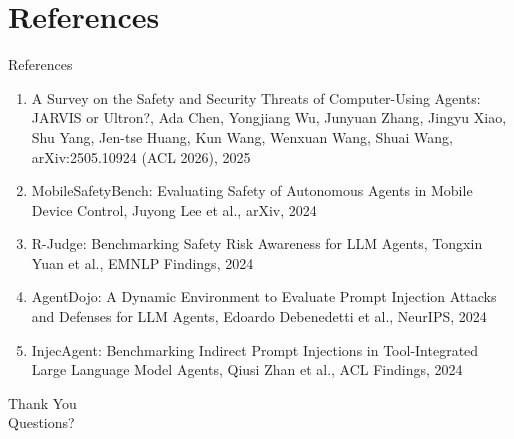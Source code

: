 \documentclass[10pt]{beamer}
\begin{document}
\section{References}
\begin{frame}[allowframebreaks]{References}
  \footnotesize
  \begin{enumerate}
    \item A Survey on the Safety and Security Threats of Computer-Using Agents: JARVIS or Ultron?, Ada Chen, Yongjiang Wu, Junyuan Zhang, Jingyu Xiao, Shu Yang, Jen-tse Huang, Kun Wang, Wenxuan Wang, Shuai Wang, arXiv:2505.10924 (ACL 2026), 2025
    \item MobileSafetyBench: Evaluating Safety of Autonomous Agents in Mobile Device Control, Juyong Lee et al., arXiv, 2024
    \item R-Judge: Benchmarking Safety Risk Awareness for LLM Agents, Tongxin Yuan et al., EMNLP Findings, 2024
    \item AgentDojo: A Dynamic Environment to Evaluate Prompt Injection Attacks and Defenses for LLM Agents, Edoardo Debenedetti et al., NeurIPS, 2024
    \item InjecAgent: Benchmarking Indirect Prompt Injections in Tool-Integrated Large Language Model Agents, Qiusi Zhan et al., ACL Findings, 2024
  \end{enumerate}
\end{frame}

\begin{frame}[plain]
  \begin{center}
    {\Huge Thank You}\\[1em]
    {\large Questions?}
  \end{center}
\end{frame}
\end{document}
